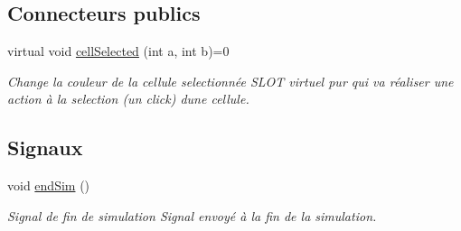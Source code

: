 \subsection*{Connecteurs publics}
\begin{DoxyCompactItemize}
\item 
virtual void \hyperlink{class_autocell_afada0a9ee44f58fe4151a205337a6787}{cell\+Selected} (int a, int b)=0
\begin{DoxyCompactList}\small\item\em Change la couleur de la cellule selectionnée S\+L\+OT virtuel pur qui va réaliser une action à la selection (un click) d\textquotesingle{}une cellule. \end{DoxyCompactList}\end{DoxyCompactItemize}
\subsection*{Signaux}
\begin{DoxyCompactItemize}
\item 
void \hyperlink{class_autocell_a4a248ebfe4372c27a2d9b03c7b14ddf4}{end\+Sim} ()
\begin{DoxyCompactList}\small\item\em Signal de fin de simulation Signal envoyé à la fin de la simulation. \end{DoxyCompactList}\end{DoxyCompactItemize}
